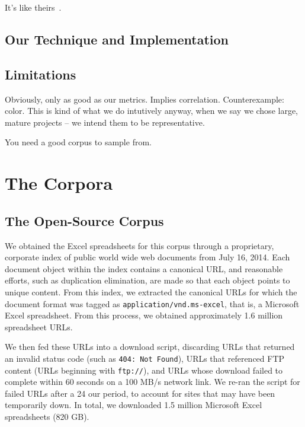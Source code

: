 \documentclass[conference]{IEEEtran}
\begin{document}
It's like theirs~\cite{nagappan2013diversity}.

\subsection{Our Technique and Implementation}

\subsection{Limitations}

Obviously, only as good as our metrics. Implies correlation. Counterexample: color.
This is kind of what we do intutively anyway, when we say we chose large, mature projects -- we intend them
to be representative.

You need a good corpus to sample from.

\section{The Corpora}

\subsection{The Open-Source Corpus}




We obtained the Excel spreadsheets for this corpus through a proprietary, corporate index of public world wide web documents from July 16, 2014. 
%
Each document object within the index contains a canonical URL, and reasonable efforts, such as duplication elimination, are made so that each object points to unique content. 
%
From this index, we extracted the canonical URLs for which the document format was tagged as \texttt{application/vnd.ms-excel}, that is, a Microsoft Excel spreadsheet. 
%
From this process, we obtained approximately 1.6 million spreadsheet URLs.

We then fed these URLs into a download script, discarding URLs that returned an invalid status code (such as \texttt{404: Not Found}), URLs that referenced FTP content (URLs beginning with \texttt{ftp://}), and URLs whose download failed to complete within 60 seconds on a 100 MB/s network link. 
%
We re-ran the script for failed URLs after a 24 our period, to account for sites that may have been temporarily down. 
%
In total, we downloaded 1.5 million Microsoft Excel spreadsheets (820 GB). 
\end{document}
